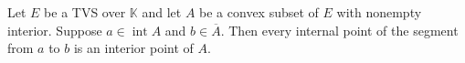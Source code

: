Let $E$ be a TVS over $\mathbb{K}$ and let $A$ be a convex subset of $E$ with nonempty interior. Suppose $a \in \operatorname{int} A$ and $b \in \overline{A}$. Then every internal point of the segment from $a$ to $b$ is an interior point of $A$.
